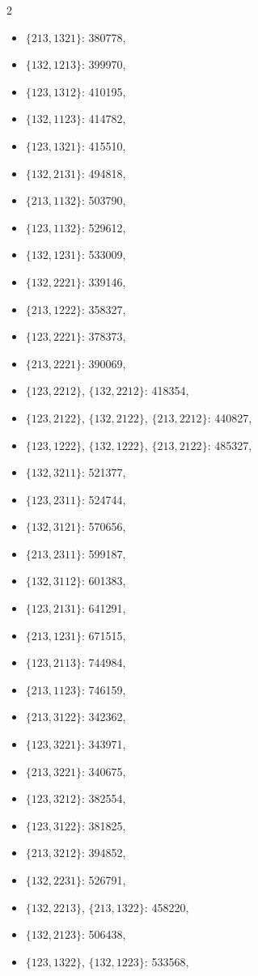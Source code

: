 \documentclass[11pt]{amsart}
\theoremstyle{plain}
\theoremstyle{definition}
\begin{document}
{\begin{multicols}{2}
\begin{itemize}
\item $\{213,1321\}$: 380778,
\item $\{132,1213\}$: 399970,
\item $\{123,1312\}$: 410195,
\item $\{132,1123\}$: 414782,
\item $\{123,1321\}$: 415510,
\item $\{132,2131\}$: 494818,
\item $\{213,1132\}$: 503790,
\item $\{123,1132\}$: 529612,
\item $\{132,1231\}$: 533009,
\item $\{132,2221\}$: 339146,
\item $\{213,1222\}$: 358327,
\item $\{123,2221\}$: 378373,
\item $\{213,2221\}$: 390069,
\item[$\blacksquare$] {$\{123,2212\}$, $\{132,2212\}$}: 418354,
\item[$\blacksquare$] {$\{123,2122\}$, $\{132,2122\}$, $\{213,2212\}$}: 440827,
\item[$\blacksquare$] {$\{123,1222\}$, $\{132,1222\}$, $\{213,2122\}$}: 485327,
\item $\{132,3211\}$: 521377,
\item $\{123,2311\}$: 524744,
\item $\{132,3121\}$: 570656,
\item $\{213,2311\}$: 599187,
\item $\{132,3112\}$: 601383,
\item $\{123,2131\}$: 641291,
\item $\{213,1231\}$: 671515,
\item $\{123,2113\}$: 744984,
\item $\{213,1123\}$: 746159,
\item $\{213,3122\}$: 342362,
\item $\{123,3221\}$: 343971,
\item $\{213,3221\}$: 340675,
\item $\{123,3212\}$: 382554,
\item $\{123,3122\}$: 381825,
\item $\{213,3212\}$: 394852,
\item $\{132,2231\}$: 526791,
\item[$\blacksquare$] {$\{132,2213\}$, $\{213,1322\}$}: 458220,
\item $\{132,2123\}$: 506438,
\item[$\blacksquare$] {$\{123,1322\}$, $\{132,1223\}$}: 533568,

\end{itemize}
\end{multicols}}
\end{document}
